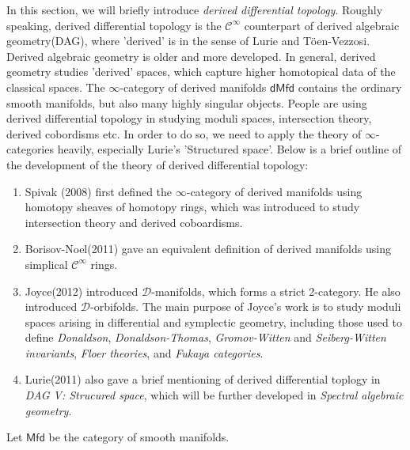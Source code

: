 \documentclass[11pt]{amsart}
\numberwithin{equation}{section}
\theoremstyle{definition}
\theoremstyle{remark}
\numberwithin{equation}{section}
\newcommand{\cinf}{{\mathcal C}^{\infty}}
\newcommand{\mfd}{\mathsf{Mfd}}
\newcommand{\dmfd}{\mathsf{dMfd}}
\begin{document}
In this section, we will briefly introduce {\it derived differential topology}. Roughly speaking, derived differential topology is the $\cinf$ counterpart of derived algebraic geometry(DAG), where 'derived' is in the sense of Lurie and T\"{o}en-Vezzosi. Derived algebraic geometry is older and more developed. In general, derived geometry studies 'derived' spaces, which capture higher homotopical data of the classical spaces. The $\infty$-category of derived manifolds $\dmfd$ contains the ordinary smooth manifolds, but also many highly singular objects. People are using derived differential topology in studying moduli spaces, intersection theory, derived cobordisms etc. In order to do so, we need to apply the theory of $\infty$-categories heavily, especially Lurie's 'Structured space'. Below is a brief outline of the development of the theory of derived differential topology:

\begin{enumerate}
	\item Spivak (2008) first defined the $\infty$-category of derived manifolds using homotopy sheaves of homotopy rings, which was introduced to study intersection theory and derived coboardisms.
	\item Borisov-Noel(2011) gave an equivalent definition of derived manifolds using simplical $\cinf$ rings.
	\item Joyce(2012) introduced $\mathcal{D}$-manifolds, which forms a strict 2-category. He also introduced $\mathcal{D}$-orbifolds. The main purpose of Joyce's work is to study moduli spaces arising in differential and symplectic geometry, including those used to define {\it Donaldson}, {\it Donaldson-Thomas}, {\it Gromov-Witten} and {\it Seiberg-Witten invariants}, {\it Floer theories}, and {\it Fukaya categories}.
	\item Lurie(2011) also gave a brief mentioning of derived differential toplogy in {\it DAG V: Strucured space}, which will be further developed in {\it Spectral algebraic geometry}.  
\end{enumerate}
Let $\mfd$ be the category of smooth manifolds.
\end{document}
